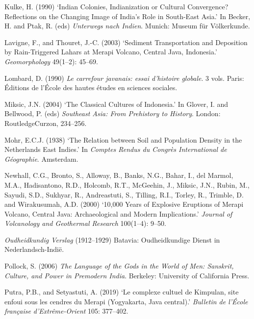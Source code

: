 \documentclass[12pt,a4paper]{article}
\begin{document}
\vspace{0.5em}
\noindent Kulke, H. (1990) `Indian Colonies, Indianization or Cultural Convergence? Reflections on the Changing Image of India's Role in South-East Asia.' In Becker, H. and Ptak, R. (eds) \emph{Unterwegs nach Indien}. Munich: Museum f\"{u}r V\"{o}lkerkunde.

\vspace{0.5em}
\noindent Lavigne, F., and Thouret, J.-C. (2003) `Sediment Transportation and Deposition by Rain-Triggered Lahars at Merapi Volcano, Central Java, Indonesia.' \emph{Geomorphology} 49(1--2): 45--69.

\vspace{0.5em}
\noindent Lombard, D. (1990) \emph{Le carrefour javanais: essai d'histoire globale}. 3 vols. Paris: \'{E}ditions de l'\'{E}cole des hautes \'{e}tudes en sciences sociales.

\vspace{0.5em}
\noindent Miksic, J.N. (2004) `The Classical Cultures of Indonesia.' In Glover, I. and Bellwood, P. (eds) \emph{Southeast Asia: From Prehistory to History}. London: RoutledgeCurzon, 234--256.

\vspace{0.5em}
\noindent Mohr, E.C.J. (1938) `The Relation between Soil and Population Density in the Netherlands East Indies.' In \emph{Comptes Rendus du Congr\`{e}s International de G\'{e}ographie}. Amsterdam.

\vspace{0.5em}
\noindent Newhall, C.G., Bronto, S., Alloway, B., Banks, N.G., Bahar, I., del Marmol, M.A., Hadisantono, R.D., Holcomb, R.T., McGeehin, J., Miksic, J.N., Rubin, M., Sayudi, S.D., Sukhyar, R., Andreastuti, S., Tilling, R.I., Torley, R., Trimble, D. and Wirakusumah, A.D. (2000) `10,000 Years of Explosive Eruptions of Merapi Volcano, Central Java: Archaeological and Modern Implications.' \emph{Journal of Volcanology and Geothermal Research} 100(1--4): 9--50.

\vspace{0.5em}
\noindent \emph{Oudheidkundig Verslag} (1912--1929) Batavia: Oudheidkundige Dienst in Nederlandsch-Indi\"{e}.

\vspace{0.5em}
\noindent Pollock, S. (2006) \emph{The Language of the Gods in the World of Men: Sanskrit, Culture, and Power in Premodern India}. Berkeley: University of California Press.

\vspace{0.5em}
\noindent Putra, P.B., and Setyastuti, A. (2019) `Le complexe cultuel de Kimpulan, site enfoui sous les cendres du Merapi (Yogyakarta, Java central).' \emph{Bulletin de l'\'{E}cole fran\c{c}aise d'Extr\^{e}me-Orient} 105: 377--402.
\end{document}
